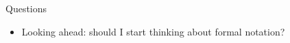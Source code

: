 \documentclass[t]{beamer}
\begin{document}
\begin{frame}{Questions}
	\begin{itemize}[label=--]
	\item Looking ahead: should I start thinking about formal notation?
	\end{itemize}
\end{frame}

%	
%
%	
%
%	
%
%
\end{document}
